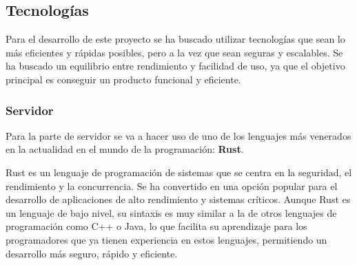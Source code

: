 \subsection{Tecnologías}
Para el desarrollo de este proyecto se ha buscado utilizar tecnologías que sean lo más eficientes y rápidas posibles, pero a la vez que sean seguras y escalables. Se ha buscado un equilibrio entre rendimiento y facilidad de uso, ya que el objetivo principal es conseguir un producto funcional y eficiente.

\subsubsection{Servidor}
Para la parte de servidor se va a hacer uso de uno de los lenguajes más venerados en la actualidad en el mundo de la programación: \textbf{Rust}.

Rust es un lenguaje de programación de sistemas que se centra en la seguridad, el rendimiento y la concurrencia. Se ha convertido en una opción popular para el desarrollo de aplicaciones de alto rendimiento y sistemas críticos.
Aunque Rust es un lenguaje de bajo nivel, su sintaxis es muy similar a la de otros lenguajes de programación como C++ o Java, lo que facilita su aprendizaje para los programadores que ya tienen experiencia en estos lenguajes, permitiendo un desarrollo más seguro, rápido y eficiente. 

